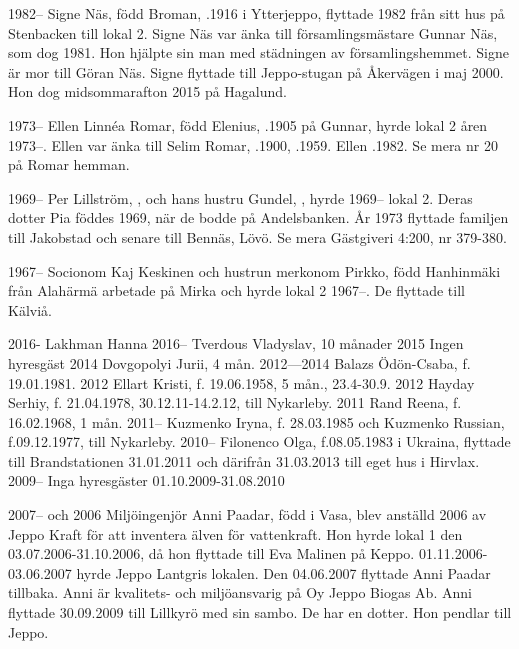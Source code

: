1982--
Signe Näs, född Broman, .1916 i Ytterjeppo, flyttade 1982 från sitt hus på Stenbacken till lokal 2. Signe Näs var änka till församlingsmästare Gunnar Näs, som dog 1981. Hon hjälpte sin man med städningen av församlingshemmet.  Signe är mor till Göran Näs. Signe flyttade till Jeppo-stugan på Åkervägen i maj 2000. Hon dog midsommarafton 2015 på Hagalund.

1973--
Ellen Linnéa Romar, född Elenius, .1905 på Gunnar, hyrde lokal 2 åren 1973--. Ellen var änka till Selim Romar, .1900, .1959. Ellen .1982. Se mera nr 20 på Romar hemman.

1969--
Per Lillström, , och hans hustru Gundel, , hyrde 1969-- lokal 2. Deras dotter Pia föddes 1969, när de bodde på Andelsbanken. År 1973 flyttade familjen till Jakobstad och senare till Bennäs, Lövö. Se mera Gästgiveri 4:200, nr 379-380.

1967--
Socionom Kaj Keskinen och hustrun merkonom Pirkko, född Hanhinmäki från Alahärmä arbetade på Mirka och hyrde lokal 2 1967--. De flyttade till Kälviå.


2016-       Lakhman Hanna
2016--   Tverdous Vladyslav, 10 månader
2015        Ingen hyresgäst
2014        Dovgopolyi Jurii, 4 mån.
2012—2014		Balazs Ödön-Csaba, f. 19.01.1981.
2012	      Ellart Kristi, f. 19.06.1958,  5 mån., 23.4-30.9.
2012        Hayday Serhiy, f. 21.04.1978, 30.12.11-14.2.12, till Nykarleby.
2011        Rand Reena, f. 16.02.1968, 1 mån.
2011--		Kuzmenko Iryna, f. 28.03.1985 och Kuzmenko Russian, f.09.12.1977, till Nykarleby.
2010--		Filonenco Olga, f.08.05.1983 i Ukraina, flyttade till Brandstationen 31.01.2011 och därifrån 31.03.2013 till eget hus i Hirvlax.
2009--		Inga hyresgäster 01.10.2009-31.08.2010

2007-- och 2006
Miljöingenjör Anni Paadar, född i Vasa, blev anställd 2006 av Jeppo Kraft för att inventera älven för vattenkraft. Hon hyrde lokal 1 den 03.07.2006-31.10.2006, då hon flyttade till Eva Malinen på Keppo.	01.11.2006-03.06.2007 hyrde Jeppo Lantgris lokalen. Den 04.06.2007 flyttade Anni Paadar tillbaka. Anni är kvalitets- och miljöansvarig på Oy Jeppo Biogas Ab. Anni flyttade 30.09.2009 till Lillkyrö med sin sambo. De har en dotter. Hon pendlar till Jeppo.

